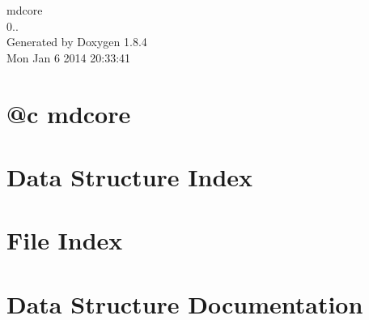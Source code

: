 \documentclass[twoside]{book}
\newcommand{\clearemptydoublepage}{%
  \newpage{\pagestyle{empty}\cleardoublepage}%
}
\begin{document}
\hypersetup{pageanchor=false}
\begin{titlepage}
\vspace*{7cm}
\begin{center}%
{\Large mdcore \\[1ex]\large 0.. }\\
\vspace*{1cm}
{\large Generated by Doxygen 1.8.4}\\
\vspace*{0.5cm}
{\small Mon Jan 6 2014 20:33:41}\\
\end{center}
\end{titlepage}
\clearemptydoublepage
\tableofcontents
\clearemptydoublepage
{}
\hypersetup{pageanchor=true}

\chapter{@c mdcore}
\label{index}\hypertarget{index}{}
\chapter{Data Structure Index}

\chapter{File Index}

\chapter{Data Structure Documentation}























\end{document}
